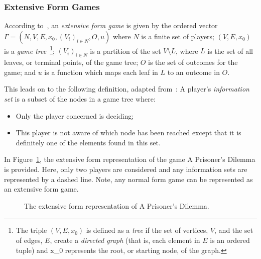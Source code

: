 \subsubsection{Extensive Form Games}\label{subsubsec:Extensive_Form_Games}
According to~\cite{maschler_solan_zamir_2013}, an \textit{extensive form game}
is given by the ordered vector
\(\Gamma = (N, V, E, x_{0}, (V_{i})_{i \in N}, O, u)\)
where \(N\) is a finite set of players; \((V, E, x_{0})\) is a \textit{game
tree}~\footnote{The triple \((V, E, x_{0})\) is defined as a \textit{tree} if
the set of vertices, \(V\), and the set of edges, \(E\), create a
\textit{directed graph} (that is, each element in \(E\) is an ordered tuple) and
x_{0} represents the root, or starting node, of the graph.}; \((V_{i})_{i \in
N}\) is a partition of the set \(V \setminus L\), where \(L\) is the set of all
leaves, or terminal points, of the game tree; \(O\) is the set of outcomes for
the game; and \(u\) is a function which maps each leaf in \(L\) to an outcome 
in \(O\).

This leads on to the following definition, adapted from~\cite{Webb2007}:
\newline
A player's \textit{information set} is a subset of the nodes in a game tree
where:
\begin{itemize}
    \item Only the player concerned is deciding;
    \item This player is not aware of which node has been reached except that it
    is definitely one of the elements found in this set.
\end{itemize} 

In Figure~\ref{fig:PD_game_tree}, the extensive form representation of the
game A Prisoner's Dilemma is provided. Here, only two players are considered and
any information sets are represented by a dashed line. Note, any normal form
game can be represented as an extensive form game. 

\begin{figure}\label{fig:PD_game_tree}
    \caption{The extensive form representation of A Prisoner's Dilemma.}
\end{figure}

